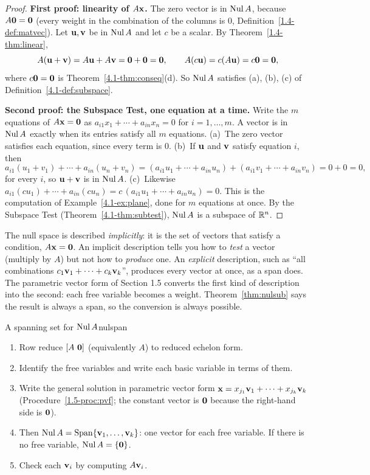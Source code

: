 \documentclass[11pt]{article}
\begin{document}
\begin{proof}
\textbf{First proof: linearity of $A\mathbf{x}$.} The zero vector is in $\operatorname{Nul} A$, because $A\mathbf{0}=\mathbf{0}$ (every weight in the combination of the columns is $0$, Definition~\ref{1.4-def:matvec}). Let $\mathbf{u},\mathbf{v}$ be in $\operatorname{Nul} A$ and let $c$ be a scalar. By Theorem~\ref{1.4-thm:linear},
\[
A(\mathbf{u}+\mathbf{v})=A\mathbf{u}+A\mathbf{v}=\mathbf{0}+\mathbf{0}=\mathbf{0},\qquad A(c\mathbf{u})=c(A\mathbf{u})=c\mathbf{0}=\mathbf{0},
\]
where $c\mathbf{0}=\mathbf{0}$ is Theorem~\ref{4.1-thm:conseq}(d). So $\operatorname{Nul} A$ satisfies (a), (b), (c) of Definition~\ref{4.1-def:subspace}.

\textbf{Second proof: the Subspace Test, one equation at a time.} Write the $m$ equations of $A\mathbf{x}=\mathbf{0}$ as $a_{i1}x_1+\cdots+a_{in}x_n=0$ for $i=1,\dots,m$. A vector is in $\operatorname{Nul} A$ exactly when its entries satisfy all $m$ equations. (a)~The zero vector satisfies each equation, since every term is $0$. (b)~If $\mathbf{u}$ and $\mathbf{v}$ satisfy equation $i$, then
\[
a_{i1}(u_1+v_1)+\cdots+a_{in}(u_n+v_n)=(a_{i1}u_1+\cdots+a_{in}u_n)+(a_{i1}v_1+\cdots+a_{in}v_n)=0+0=0,
\]
for every $i$, so $\mathbf{u}+\mathbf{v}$ is in $\operatorname{Nul} A$. (c)~Likewise $a_{i1}(cu_1)+\cdots+a_{in}(cu_n)=c\,(a_{i1}u_1+\cdots+a_{in}u_n)=0$. This is the computation of Example~\ref{4.1-ex:plane}, done for $m$ equations at once. By the Subspace Test (Theorem~\ref{4.1-thm:subtest}), $\operatorname{Nul} A$ is a subspace of $\mathbb{R}^n$.
\end{proof}

\begin{remark}
The null space is described \emph{implicitly}: it is the set of vectors that satisfy a condition, $A\mathbf{x}=\mathbf{0}$. An implicit description tells you how to \emph{test} a vector (multiply by $A$) but not how to \emph{produce} one. An \emph{explicit} description, such as ``all combinations $c_1\mathbf{v}_1+\cdots+c_k\mathbf{v}_k$'', produces every vector at once, as a span does. The parametric vector form of Section 1.5 converts the first kind of description into the second: each free variable becomes a weight. Theorem~\ref{thm:nulsub} says the result is always a span, so the conversion is always possible.
\end{remark}

\begin{proc}{A spanning set for $\operatorname{Nul} A$}{nulspan}
\begin{enumerate}
  \item Row reduce $[A\ \mathbf{0}]$ (equivalently $A$) to reduced echelon form.
  \item Identify the free variables and write each basic variable in terms of them.
  \item Write the general solution in parametric vector form $\mathbf{x}=x_{j_1}\mathbf{v}_1+\cdots+x_{j_k}\mathbf{v}_k$ (Procedure~\ref{1.5-proc:pvf}; the constant vector is $\mathbf{0}$ because the right-hand side is $\mathbf{0}$).
  \item Then $\operatorname{Nul} A=\operatorname{Span}\{\mathbf{v}_1,\dots,\mathbf{v}_k\}$: one vector for each free variable. If there is no free variable, $\operatorname{Nul} A=\{\mathbf{0}\}$.
  \item Check each $\mathbf{v}_i$ by computing $A\mathbf{v}_i$.
\end{enumerate}
\end{proc}
\end{document}
